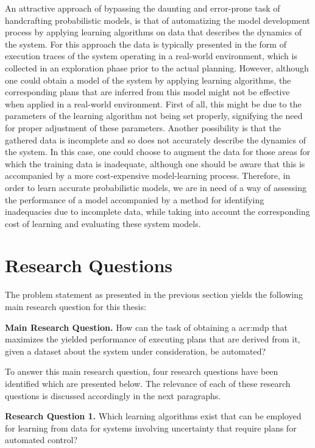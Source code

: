 An attractive approach of bypassing the daunting and error-prone task of handcrafting probabilistic models, is that of automatizing the model development process by applying learning algorithms on data that describes the dynamics of the system.
For this approach the data is typically presented in the form of execution traces of the system operating in a real-world environment, which is collected in an exploration phase prior to the actual planning.
However, although one could obtain a model of the system by applying learning algorithms, the corresponding plans that are inferred from this model might not be effective when applied in a real-world environment.
First of all, this might be due to the parameters of the learning algorithm not being set properly, signifying the need for proper adjustment of these parameters.
Another possibility is that the gathered data is incomplete and so does not accurately describe the dynamics of the system.
In this case, one could choose to augment the data for those areas for which the training data is inadequate, although one should be aware that this is accompanied by a more cost-expensive model-learning process.
Therefore, in order to learn accurate probabilistic models, we are in need of a way of assessing the performance of a model accompanied by a method for identifying inadequacies due to incomplete data, while taking into account the corresponding cost of learning and evaluating these system models.

\section{Research Questions}
\label{sec:research-questions}
The problem statement as presented in the previous section yields the following main research question for this thesis:

\vspace{12pt}
\noindent%
\textbf{Main Research Question.} How can the task of obtaining a \acrfull{acr:mdp} that maximizes the yielded performance of executing plans that are derived from it, given a dataset about the system under consideration, be automated?
\vspace{12pt}

To answer this main research question, four research questions have been identified which are presented below.
The relevance of each of these research questions is discussed accordingly in the next paragraphs.

\vspace{16pt}
\noindent%
\textbf{Research Question 1.} Which learning algorithms exist that can be employed for learning  from data for systems involving uncertainty that require plans for automated control?
\vspace{0pt}

